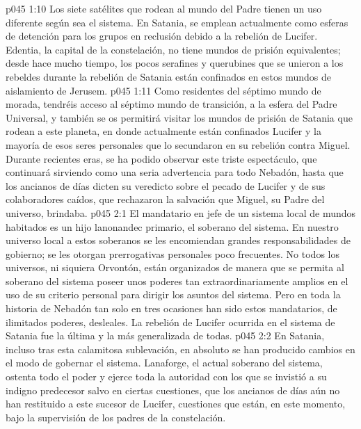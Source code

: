 \vs p045 1:10 Los siete satélites que rodean al mundo del Padre tienen un uso diferente según sea el sistema. En Satania, se emplean actualmente como esferas de detención para los grupos en reclusión debido a la rebelión de Lucifer. Edentia, la capital de la constelación, no tiene mundos de prisión equivalentes; desde hace mucho tiempo, los pocos serafines y querubines que se unieron a los rebeldes durante la rebelión de Satania están confinados en estos mundos de aislamiento de Jerusem.
\vs p045 1:11 Como residentes del séptimo mundo de morada, tendréis acceso al séptimo mundo de transición, a la esfera del Padre Universal, y también se os permitirá visitar los mundos de prisión de Satania que rodean a este planeta, en donde actualmente están confinados Lucifer y la mayoría de esos seres personales que lo secundaron en su rebelión contra Miguel. Durante recientes eras, se ha podido observar este triste espectáculo, que continuará sirviendo como una seria advertencia para todo Nebadón, hasta que los ancianos de días dicten su veredicto sobre el pecado de Lucifer y de sus colaboradores caídos, que rechazaron la salvación que Miguel, su Padre del universo, brindaba.
\vs p045 2:1 El mandatario en jefe de un sistema local de mundos habitados es un hijo lanonandec primario, el soberano del sistema. En nuestro universo local a estos soberanos se les encomiendan grandes responsabilidades de gobierno; se les otorgan prerrogativas personales poco frecuentes. No todos los universos, ni siquiera Orvontón, están organizados de manera que se permita al soberano del sistema poseer unos poderes tan extraordinariamente amplios en el uso de su criterio personal para dirigir los asuntos del sistema. Pero en toda la historia de Nebadón tan solo en tres ocasiones han sido estos mandatarios, de ilimitados poderes, desleales. La rebelión de Lucifer ocurrida en el sistema de Satania fue la última y la más generalizada de todas.
\vs p045 2:2 En Satania, incluso tras esta calamitosa sublevación, en absoluto se han producido cambios en el modo de gobernar el sistema. Lanaforge, el actual soberano del sistema, ostenta todo el poder y ejerce toda la autoridad con los que se invistió a su indigno predecesor salvo en ciertas cuestiones, que los ancianos de días aún no han restituido a este sucesor de Lucifer, cuestiones que están, en este momento, bajo la supervisión de los padres de la constelación.
